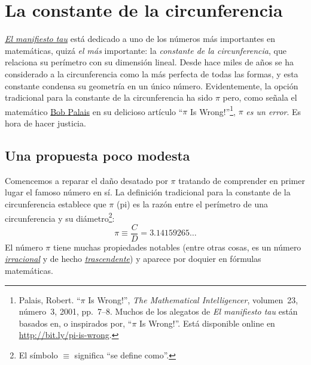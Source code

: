 
\section{La constante de la circunferencia} %
\label{sec:the_circle_constant}

\href{http://tauday.com/tau-manifesto}{\emph{El manifiesto tau}} está dedicado a uno de los números más importantes en matemáticas, quizá \emph{el más} importante: la \emph{constante de la circunferencia}, que relaciona su perímetro con su dimensión lineal. Desde hace miles de años se ha considerado a la circunferencia como la más perfecta de todas las formas, y esta constante condensa su geometría en un único número. Evidentemente, la opción tradicional para la constante de la circunferencia ha sido $\pi$ pero, como señala el matemático \href{http://www.math.utah.edu/~palais}{Bob Palais} en su delicioso artículo ``$\pi$ Is Wrong!''\footnote{Palais, Robert. ``$\pi$ Is Wrong!'', \emph{The Mathematical Intelligencer}, volumen~23, número~3, 2001, pp.~7--8. Muchos de los alegatos de \emph{El manifiesto tau} están basados en, o inspirados por, ``$\pi$ Is Wrong!''. Está disponible online en \href{http://www.math.utah.edu/~palais/pi.html}{http://bit.ly/pi-is-wrong}.}, $\pi$ \emph{es un error}. Es hora de hacer justicia.

  \subsection{Una propuesta poco modesta} %
  \label{sec:an_immodest_proposal}

Comencemos a reparar el daño desatado por $\pi$ tratando de comprender en primer lugar el famoso número en sí. La definición tradicional para la constante de la circunferencia establece que $\pi$ (pi) es la razón entre el perímetro de una circunferencia y su diámetro\footnote{El símbolo $\equiv$ significa ``se define como''.}:
\begin{equation}
\label{eq:pi}
\pi \equiv \frac{C}{D} = 3.14159265\ldots
\end{equation}
El número $\pi$ tiene muchas propiedades notables (entre otras cosas, es un número \href{https://es.wikipedia.org/wiki/Número_irracional}{\emph{irracional}} y de hecho \href{https://es.wikipedia.org/wiki/Número_trascendente}{\emph{trascendente}}) y aparece por doquier en fórmulas matemáticas.

